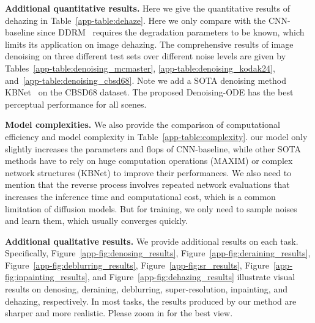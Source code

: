 \documentclass{article}
\theoremstyle{plain}
\theoremstyle{definition}
\theoremstyle{remark}
\begin{document}
\textbf{Additional quantitative results.}
Here we give the quantitative results of dehazing in Table~\ref{app-table:dehaze}. Here we only compare with the CNN-baseline since DDRM~\cite{kawar2022denoising} requires the degradation parameters to be known, which limits its application on image dehazing.
The comprehensive results of image denoising on three different test sets over different noise levels are given by Tables~\ref{app-table:denoising_mcmaster}, \ref{app-table:denoising_kodak24}, and~\ref{app-table:denoising_cbsd68}. Note we add a SOTA denoising method KBNet~\cite{zhang2023kbnet} on the CBSD68 dataset. The proposed Denoising-ODE has the best perceptual performance for all scenes. 

\textbf{Model complexities.}
We also provide the comparison of computational efficiency and model complexity in Table~\ref{app-table:complexity}. our model only slightly increases the parameters and flops of CNN-baseline, while other SOTA methods have to rely on huge computation operations (MAXIM) or complex network structures (KBNet) to improve their performances. We also need to mention that the reverse process involves repeated network evaluations that increases the inference time and computational cost, which is a common limitation of diffusion models. But for training, we only need to sample noises and learn them, which usually converges quickly. 

\textbf{Additional qualitative results.}
We provide additional results on each task. Specifically, Figure~\ref{app-fig:denosing_results},
Figure~\ref{app-fig:deraining_results}, Figure~\ref{app-fig:deblurring_results}, Figure~\ref{app-fig:sr_results}, Figure~\ref{app-fig:inpainting_results}, and Figure~\ref{app-fig:dehazing_results} illustrate visual results on denosing, deraining, deblurring, super-resolution, inpainting, and dehazing, respectively. In most tasks, the results produced by our method are sharper and more realistic. Please zoom in for the best view.


\vskip 1.0in
\end{document}
